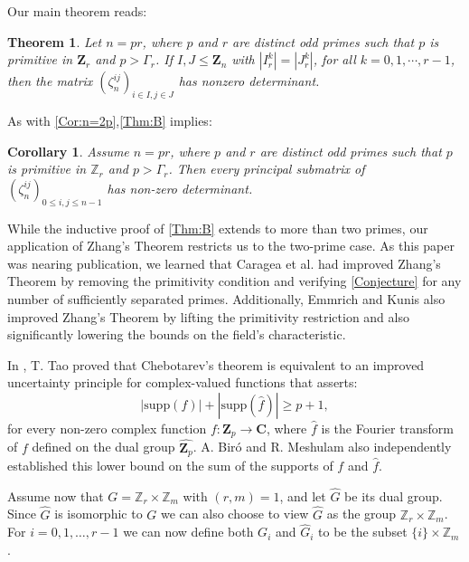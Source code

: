 \documentclass[a4paper,12pt,reqno]{amsart}
\newtheorem{prevtheorem}{Theorem}
\newtheorem{corollary}{Corollary}
\def\Z{\mathbf{Z}}
\def\C{\mathbf{C}}
\def\supp{\mathrm{supp}}
\begin{document}
Our main theorem reads:
\begin{prevtheorem}
\label{Thm:B}
Let $ n = pr$, where $ p $ and $r$ are distinct odd primes such that $p$ is primitive in $\Z_r$ and $ p >\Gamma_r$.    If $I, J \leq \Z_{n}$ with $|I_r^k| = |J_r^k|$, for all $k=0,1, \cdots,  r-1$, then the matrix $(\zeta_{n}^{ij})_{i \in I, j\in J}$ has nonzero determinant.    
\end{prevtheorem}



As with \autoref{Cor:n=2p},\autoref{Thm:B} implies:
\begin{corollary}\label{Cor:n=pr}
    Assume  $ n = pr$, where $ p $ and $r$ are distinct odd primes such that $p$ is primitive in  $\mathbb{Z}_r$ and $ p >\Gamma_r$. Then every principal  submatrix of $(\zeta_n^{ij})_{0 \leq i,j\leq n-1}$ has non-zero determinant.
\end{corollary}

While the inductive proof of \autoref{Thm:B} extends to more than two primes, our application of Zhang's Theorem restricts us to the two-prime case. %
As this paper was nearing publication, we learned that Caragea et al. \cite{CaLeMaPf} had improved Zhang's Theorem by removing the primitivity condition and  verifying \autoref{Conjecture} for any number of sufficiently separated primes. Additionally, Emmrich and Kunis \cite{EmKu} also improved Zhang's Theorem by lifting the primitivity restriction and also significantly lowering the bounds on the field's characteristic.


In \cite{Tao}, T. Tao proved that Chebotarev's theorem is equivalent to an improved uncertainty principle for complex-valued functions that  asserts: 
\[
|\supp(f)| + |\supp(\widehat{f})| \geq p + 1, 
\]
for every non-zero complex function $f : \Z_p \to \C$, where $\widehat{f}$ is the Fourier transform of $f$ defined on the dual group $\widehat{\Z_p}$. A. Biró \cite{Biro} and R. Meshulam \cite{Meshulam} also independently established this lower bound on the sum of the supports of $f$ and $\widehat{f}$.


Assume now that $G = \mathbb{Z}_r \times \mathbb{Z}_m$ with $(r, m) = 1$, and let $\widehat{G}$ be its dual group. Since $\widehat{G}$ is isomorphic to $G$ we can also choose to view $\widehat{G}$ as the group $\mathbb{Z}_r\times\mathbb{Z}_m$. For $i=0, 1, \ldots, r-1$ we can now define both $G_i$ and $\widehat{G}_i$ to be the subset $\{i\}\times\mathbb{Z}_m$.
\end{document}
